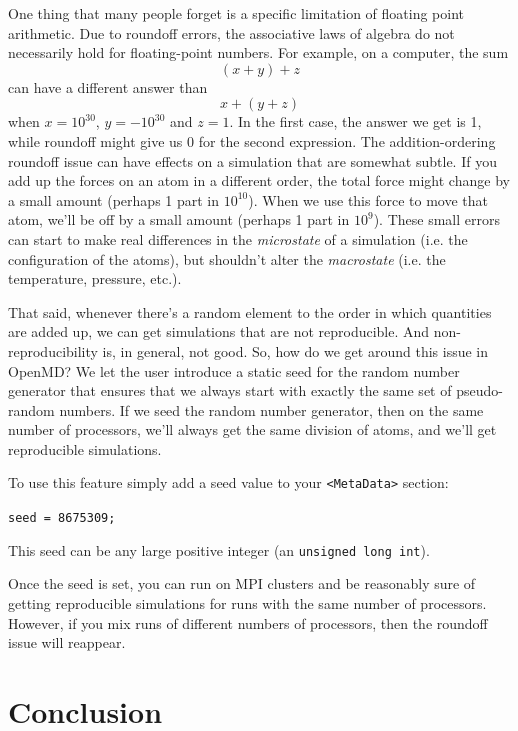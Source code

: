 \documentclass[letterpaper]{report}
\begin{document}
One thing that many people forget is a specific limitation of floating
point arithmetic.  Due to roundoff errors, the associative laws of
algebra do not necessarily hold for floating-point numbers. For
example, on a computer, the sum
\begin{equation*}
(x+y)+z
\end{equation*}
can have a different answer than
\begin{equation*}
x+(y+z)
\end{equation*}
when $x = 10^{30}$, $y = -10^{30}$ and $z = 1$.  In the first case,
the answer we get is 1, while roundoff might give us 0 for the second
expression.  The addition-ordering roundoff issue can have effects on
a simulation that are somewhat subtle.  If you add up the forces on an
atom in a different order, the total force might change by a small
amount (perhaps 1 part in $10^{10}$). When we use this force to move that
atom, we’ll be off by a small amount (perhaps 1 part in $10^9$). These
small errors can start to make real differences in the {\it microstate} of a
simulation (i.e. the configuration of the atoms), but shouldn’t alter
the {\it macrostate} (i.e. the temperature, pressure, etc.).

That said, whenever there’s a random element to the order in which
quantities are added up, we can get simulations that are not
reproducible.  And non-reproducibility is, in general, not good.  So,
how do we get around this issue in OpenMD?  We let the user introduce
a static seed for the random number generator that ensures that we
always start with exactly the same set of pseudo-random numbers.  If
we seed the random number generator, then on the same number of
processors, we’ll always get the same division of atoms, and we’ll get
reproducible simulations.

To use this feature simply add a seed value to your {\tt <MetaData>} section:

{\tt seed = 8675309;}

This seed can be any large positive integer (an {\tt unsigned long int}).

Once the seed is set, you can run on MPI clusters and be reasonably
sure of getting reproducible simulations for runs with the same number
of processors.  However, if you mix runs of different numbers of
processors, then the roundoff issue will reappear.
 
\chapter{\label{section:conclusion}Conclusion}
\end{document}
